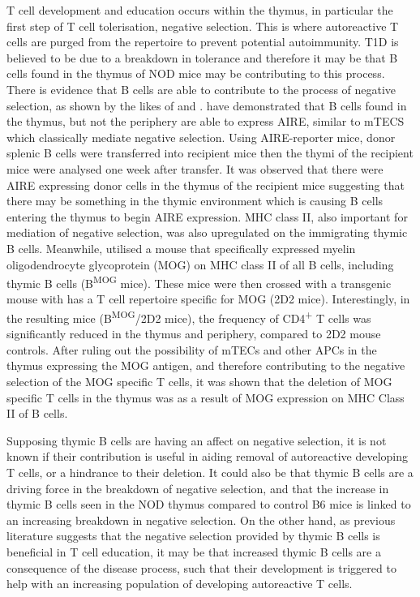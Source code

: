 T cell development and education occurs within the thymus, in particular the first step of T cell tolerisation, negative selection.
This is where autoreactive T cells are purged from the repertoire to prevent potential autoimmunity.
T1D is believed to be due to a breakdown in tolerance and therefore it may be that B cells found in the thymus of NOD mice may be contributing to this process.
There is evidence that B cells are able to contribute to the process of negative selection, as shown by the likes of \citet{Frommer2010} and \citet{Yamano2015}.
\citet{Yamano2015} have demonstrated that B cells found in the thymus, but not the periphery are able to express AIRE, similar to mTECS which classically mediate negative selection.
Using AIRE-reporter mice, donor splenic B cells were transferred into recipient mice then the thymi of the recipient mice were analysed one week after transfer.
It was observed that there were AIRE expressing donor cells in the thymus of the recipient mice suggesting that there may be something in the thymic environment which is causing B cells entering the thymus to begin AIRE expression.
MHC class II, also important for mediation of negative selection, was also upregulated on the immigrating thymic B cells.
Meanwhile, \citet{Frommer2010} utilised a mouse that specifically expressed myelin oligodendrocyte glycoprotein (MOG) on MHC class II of all B cells, including thymic B cells (B\textsuperscript{MOG} mice). 
These mice were then crossed with a transgenic mouse with has a T cell repertoire specific for MOG (2D2 mice).
Interestingly, in the resulting mice (B\textsuperscript{MOG}/2D2 mice), the frequency of CD4\textsuperscript{+} T cells was significantly reduced in the thymus and periphery, compared to 2D2 mouse controls.
After ruling out the possibility of mTECs and other APCs in the thymus expressing the MOG antigen, and therefore contributing to the negative selection of the MOG specific T cells, it was shown that the deletion of MOG specific T cells in the thymus was as a result of MOG expression on MHC Class II of B cells. 



Supposing thymic B cells are having an affect on negative selection, it is not known if their contribution is useful in aiding removal of autoreactive developing T cells, or a hindrance to their deletion.
It could also be that thymic B cells are a driving force in the breakdown of negative selection, and that the increase in thymic B cells seen in the NOD thymus compared to control B6 mice is linked to an increasing breakdown in negative selection.
On the other hand, as previous literature suggests that the negative selection provided by thymic B cells is beneficial in T cell education, it may be that increased thymic B cells are a consequence of the disease process, such that their development is triggered to help with an increasing population of developing autoreactive T cells.

